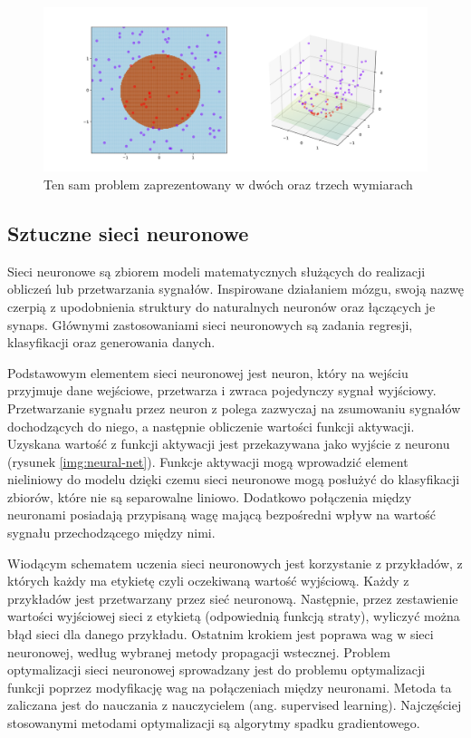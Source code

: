 \documentclass[a4paper, twoside, 11pt, openright]{article}
\begin{document}
\begin{figure}[H]
\centering \includegraphics[scale=0.2]{img/svm2.png}
\caption{Ten sam problem zaprezentowany w dwóch oraz trzech wymiarach \cite{wikisvm}}
\label{img:wiki_svm2}
\end{figure}


\subsection{Sztuczne sieci neuronowe}

Sieci neuronowe \cite{neural-nets} są zbiorem modeli matematycznych służących do realizacji obliczeń lub przetwarzania sygnałów. Inspirowane działaniem mózgu, swoją nazwę czerpią z upodobnienia struktury do naturalnych neuronów oraz łączących je synaps. Głównymi zastosowaniami sieci neuronowych są zadania regresji, klasyfikacji oraz generowania danych. 

\bigskip

Podstawowym elementem sieci neuronowej jest neuron, który na wejściu przyjmuje dane wejściowe, przetwarza i zwraca pojedynczy sygnał wyjściowy. Przetwarzanie sygnału przez neuron z polega zazwyczaj na zsumowaniu sygnałów dochodzących do niego, a następnie obliczenie wartości funkcji aktywacji. Uzyskana wartość z funkcji aktywacji jest przekazywana jako wyjście z neuronu (rysunek \ref{img:neural-net}). Funkcje aktywacji mogą wprowadzić element nieliniowy do modelu dzięki czemu sieci neuronowe mogą posłużyć do klasyfikacji zbiorów, które nie są separowalne liniowo. Dodatkowo połączenia między neuronami posiadają przypisaną wagę mającą bezpośredni wpływ na wartość sygnału przechodzącego między nimi.

\bigskip

Wiodącym schematem uczenia sieci neuronowych jest korzystanie z przykładów, z których każdy ma etykietę czyli oczekiwaną wartość wyjściową. Każdy z przykładów jest przetwarzany przez sieć neuronową. Następnie, przez zestawienie wartości wyjściowej sieci z etykietą (odpowiednią funkcją straty), wyliczyć można błąd sieci dla danego przykładu. Ostatnim krokiem jest poprawa wag w sieci neuronowej, według wybranej metody propagacji wstecznej. Problem optymalizacji sieci neuronowej sprowadzany jest do problemu optymalizacji funkcji poprzez modyfikację wag na połączeniach między neuronami. Metoda ta zaliczana jest do nauczania z nauczycielem (ang. supervised learning). Najczęściej stosowanymi metodami optymalizacji są algorytmy spadku gradientowego. 
\end{document}
